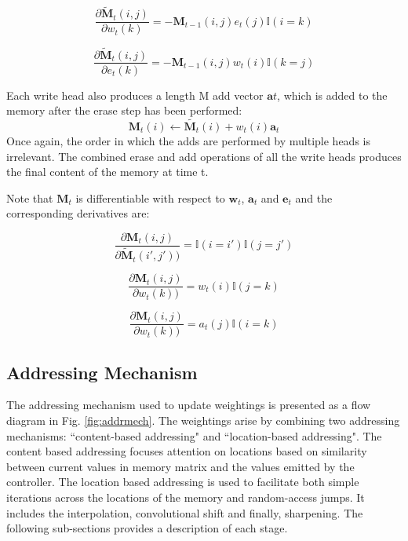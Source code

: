 \begin{equation}
\frac{\partial \widetilde{\textbf{M}}_t(i,j)}{\partial w_t(k)} = -\textbf{M}_{t-1}(i,j)e_t(j)\mathbb{I}(i=k)
\end{equation}

\begin{equation}
\frac{\partial \widetilde{\textbf{M}}_t(i,j)}{\partial e_t(k)} = -\textbf{M}_{t-1}(i,j)w_t(i)\mathbb{I}(k=j)
\end{equation}

Each write head also produces a length M add vector $\textbf{a}t$, which is added to the memory after the erase step has been performed:
\begin{equation}
\textbf{M}_t(i) \leftarrow \widetilde{\textbf{M}_t}(i) + w_t(i)\textbf{a}_t
\end{equation}
\noindent
Once again, the order in which the adds are performed by multiple heads is irrelevant. The combined erase and add operations of all the write heads produces the final content of the memory at time t.

Note that $\textbf{M}_t$ is differentiable with respect to $\textbf{w}_t$, $\textbf{a}_t$ and $\textbf{e}_t$ and the corresponding derivatives are:

\begin{equation}
\frac{\partial \textbf{M}_t(i,j)}{\partial \widetilde{\textbf{M}}_t(i',j'))} = \mathbb{I}(i=i')\mathbb{I}(j=j')
\end{equation}

\begin{equation}
\frac{\partial \textbf{M}_t(i,j)}{\partial w_t(k))} = w_t(i)\mathbb{I}(j=k)
\end{equation}

\begin{equation}
\frac{\partial \textbf{M}_t(i,j)}{\partial w_t(k))} = a_t(j)\mathbb{I}(i=k)
\end{equation}

\subsection{Addressing Mechanism}
The addressing mechanism used to update weightings is presented as a flow diagram in Fig. \ref{fig:addrmech}. The weightings arise by combining two addressing mechanisms: ``content-based addressing" and ``location-based addressing". The content based addressing focuses attention on locations based on similarity between current values in memory matrix and the values emitted by the controller. The location based addressing is used to facilitate both simple iterations across the locations of the memory and random-access jumps. It includes the interpolation, convolutional shift and finally, sharpening. The following sub-sections provides a description of each stage.

